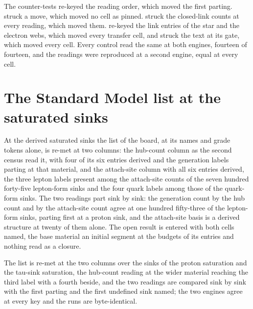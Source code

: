 \begin{chproof}[finite]
The counter-tests re-keyed the reading order, which moved the first parting. struck a move, which moved no cell as pinned. struck the closed-link counts at every reading, which moved them. re-keyed the link entries of the star and the electron webs, which moved every transfer cell, and struck the text at its gate, which moved every cell. Every control read the same at both engines, fourteen of fourteen, and the readings were reproduced at a second engine, equal at every cell.
\end{chproof}
\section{The Standard Model list at the saturated sinks}\label{mod:I-5-D538426-w-msss}
\begin{chwall}\label{box:I-5-D538426-w-msss:1}
At the derived saturated sinks the list of the board, at its names and grade tokens alone, is re-met at two columns: the hub-count column as the second census read it, with four of its six entries derived and the generation labels parting at that material, and the attach-site column with all six entries derived, the three lepton labels present among the attach-site counts of the seven hundred forty-five lepton-form sinks and the four quark labels among those of the quark-form sinks. The two readings part sink by sink: the generation count by the hub count and by the attach-site count agree at one hundred fifty-three of the lepton-form sinks, parting first at a proton sink, and the attach-site basis is a derived structure at twenty of them alone. The open result is entered with both cells named, the base material an initial segment at the budgets of its entries and nothing read as a closure.
\end{chwall}
The list is re-met at the two columns over the sinks of the proton saturation and the tau-sink saturation, the hub-count reading at the wider material reaching the third label with a fourth beside, and the two readings are compared sink by sink with the first parting and the first undefined sink named; the two engines agree at every key and the runs are byte-identical.

